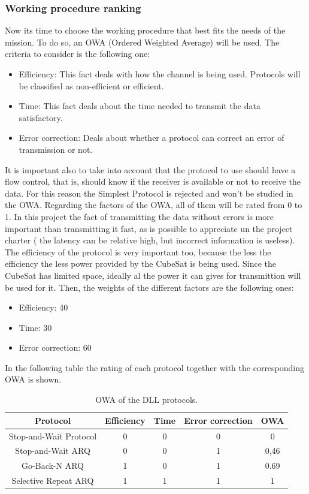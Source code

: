 \subsubsection{Working procedure ranking}
Now its time to choose the working procedure that best fits the needs of the mission. To do so, an OWA (Ordered Weighted Average) will be used. The criteria to consider is the following one:
\begin{itemize}
\item Efficiency: This fact deals with how the channel is being used. Protocols will be classified as non-efficient or efficient. 
\item Time: This fact deals about the time needed to transmit the data satisfactory.
\item Error correction: Deals about whether a protocol can correct an error of transmission or not.
\end{itemize}
It is important also to take into account that the protocol to use should have a flow control, that is, should know if the receiver is available or not to receive the data. For this reason the Simplest Protocol is rejected and won't be studied in the OWA. Regarding the factors of the OWA, all of them will be rated from 0 to 1. In this project the fact of transmitting the data without errors is more important than transmitting it fast, as is possible to appreciate un the project charter ( the latency can be relative high, but incorrect information is useless). The efficiency of the protocol is very important too, because the less the efficiency the less power provided by the CubeSat is being used. Since the CubeSat has limited space, ideally al the power it can gives for transmittion will be used for it. Then, the weights of the different factors are the following ones:
\begin{itemize}
\item Efficiency: 40
\item Time: 30
\item Error correction: 60
\end{itemize} 
In the following table the rating of each protocol together with the corresponding OWA is shown. 
\begin{table}[H]
\begin{center}
\begin{tabular}{ | c | c | c | c | c |}
\hline
Protocol&Efficiency&Time&Error correction&OWA\\
\hline
Stop-and-Wait Protocol&0&0&0&0\\
\hline
Stop-and-Wait ARQ&0&0&1&0,46\\
\hline
Go-Back-N ARQ&1&0&1&0.69\\
\hline
Selective Repeat ARQ&1&1&1&1\\
\hline
\end{tabular}
\caption{OWA of the DLL protocols.}
\end{center}
\end{table} 
